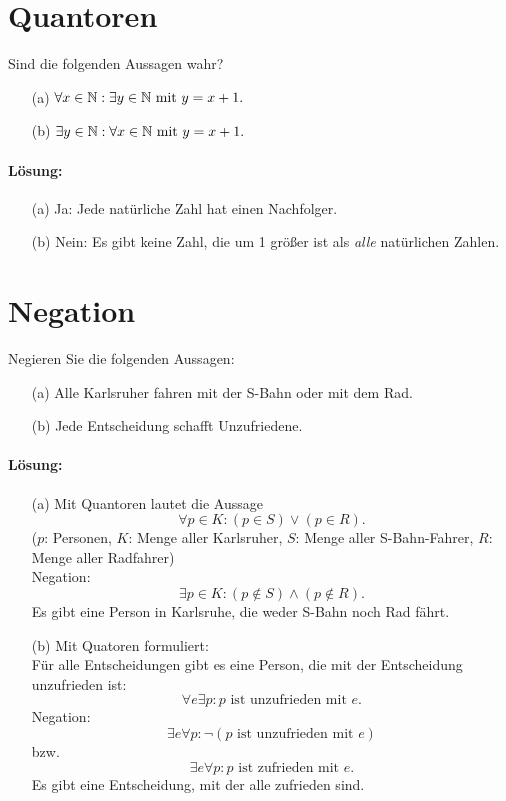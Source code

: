\documentclass[
				a4paper,
				10pt
			]
			{scrartcl}
\begin{document}
\section{Quantoren}
Sind die folgenden Aussagen wahr?
\begin{itemize}
	\item[(a)] $\forall x\in \mathbb{N}: \exists y\in \mathbb{N} \text{~mit~} y = x+1.$
	\item[(b)] $\exists y\in \mathbb{N}: \forall x\in \mathbb{N} \text{~mit~} y = x+1.$
\end{itemize}

\paragraph{L\"osung:}
\begin{itemize}
	\item[(a)] Ja: Jede nat\"urliche Zahl hat einen Nachfolger. 
	\item[(b)] Nein: Es gibt keine Zahl, die um 1 gr\"o{\ss}er ist als {\em alle} nat\"urlichen Zahlen.
\end{itemize}


\newpage
\section{Negation}
 Negieren Sie die folgenden Aussagen:
 \begin{itemize}
	\item[(a)] Alle Karlsruher fahren mit der S-Bahn oder mit dem Rad.
 	\item[(b)] Jede Entscheidung schafft Unzufriedene.
 \end{itemize}
 
\paragraph{L\"osung:}
 \begin{itemize}
	\item[(a)] Mit Quantoren lautet die Aussage
			$$
				\forall p \in K: (p\in S) \lor (p\in R). 
			$$	
			($p$: Personen, $K$: Menge aller Karlsruher, $S$: Menge aller S-Bahn-Fahrer, $R$: Menge aller Radfahrer)\\
			Negation:
			$$
				\exists p \in K:  (p\notin S) \land (p\notin R). 
			$$
			Es gibt eine Person in Karlsruhe, die weder S-Bahn noch Rad f\"ahrt.
			
 	\item[(b)] Mit Quatoren formuliert:\\
			F\"ur alle Entscheidungen gibt es eine Person, die mit der Entscheidung unzufrieden ist:
			$$
				\forall e \exists p : p \text{~ist unzufrieden mit~} e.
			$$
			Negation:\\
			$$
				\exists e \forall p : \neg(p \text{~ist unzufrieden mit~} e)
			$$
			bzw.
			$$
				\exists e \forall p : p \text{~ist zufrieden mit~} e.
			$$			
			Es gibt eine Entscheidung, mit der alle zufrieden sind.	
 \end{itemize}
\end{document}
